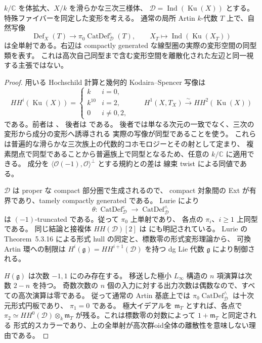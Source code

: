 \begin{proposition}[通常のArtin基底上の幾何的認識]
\label{prop:kuznetsov-formal-recognition}
$k/\mathbb C$ を体拡大、$X/k$ を滑らかな三次三様体、
$\mathcal D=\operatorname{Ind}(\operatorname{Ku}(X))$ とする。
特殊ファイバーを同定した変形を考える。
通常の局所 Artin $k$-代数 $T$ 上で、自然写像
\[
 \operatorname{Def}_X(T)\longrightarrow
 \pi_0\operatorname{CatDef}^{c}_{\mathcal D}(T),\qquad
 X_T\longmapsto\operatorname{Ind}(\operatorname{Ku}(X_T))
\]
は全単射である。右辺は compactly generated な線型圏の実際の変形空間の同型類を表す。
これは高次自己同型まで含む変形空間を離散化された左辺と同一視する主張ではない。
\end{proposition}
\begin{proof}
用いる Hochschild 計算と幾何的 Kodaira--Spencer 写像は
\begin{equation}\label{eq:kuznetsov-formal-hh}
 HH^i(\operatorname{Ku}(X))=
 \begin{cases}k&i=0,\\ k^{10}&i=2,\\0&i\ne0,2,\end{cases}
 \qquad
 H^1(X,T_X)\xrightarrow{\sim}HH^2(\operatorname{Ku}(X))
\end{equation}
である。前者は \cite[Theorem~8.9]{KuznetsovHochschild}、
後者は \cite[Theorem~4.4(2)]{JLLZInfinitesimal} である。
後者では単なる次元の一致でなく、三次の変形から成分の変形へ誘導される
実際の写像が同型であることを使う。
これらは普遍的な滑らかな三次族上の代数的コホモロジーとその射として定まり、
複素閉点で同型であることから普遍族上で同型となるため、任意の $k/\mathbb C$ に適用できる。
成分を $\langle\mathcal O(-1),\mathcal O\rangle^\perp$ とする規約との差は
線束 twist による同値である。

$\mathcal D$ は proper な compact 部分圏で生成されるので、
compact 対象間の Ext が有界であり、tamely compactly generated である。
Lurie \cite[Definition~5.3.20, Proposition~5.3.21 and Theorem~5.1.9]{LurieDAGX} により
\[
 \theta:\operatorname{CatDef}^{c}_{\mathcal D}
       \longrightarrow\operatorname{CatDef}^{\wedge}_{\mathcal D}
\]
は $(-1)$-truncated である。従って $\pi_0$ 上単射であり、
各点の $\pi_i$、$i\ge1$ 上同型である。
同じ結論と接複体 $HH(\mathcal D)[2]$ は
\cite[\S3.3]{BKPFormalGenerators} にも明記されている。
Lurie の Theorem~5.3.16 による形式 hull の同定と、標数零の形式変形理論から、
可換 Artin 環への制限は $H^i(\mathfrak g)=HH^{i+1}(\mathcal D)$ を持つ
dg Lie 代数 $\mathfrak g$ により制御される。

$H(\mathfrak g)$ は次数 $-1,1$ にのみ存在する。
移送した極小 $L_\infty$ 構造の $n$ 項演算は次数 $2-n$ を持つ。
奇数次数の $n$ 個の入力に対する出力次数は偶数なので、すべての高次演算は零である。
従って通常の Artin 基底上では
$\pi_0\operatorname{CatDef}^{\wedge}_{\mathcal D}$ は十次元形式円板であり、
$\pi_1=0$ である。
極大イデアルを $\mathfrak m_T$ とすれば、各点で
$\pi_2\simeq HH^0(\mathcal D)\otimes_k\mathfrak m_T$
が残る。これは標数零の対数によって $1+\mathfrak m_T$ と同定される
形式的スカラーであり、上の全単射が高次群oid全体の離散性を意味しない理由である。


\end{proof}
